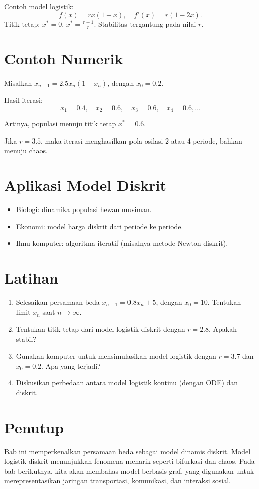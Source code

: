\documentclass{bukumjh}
\begin{document}
Contoh model logistik:
\[
f(x) = rx(1-x), \quad f'(x) = r(1-2x).
\]
Titik tetap: $x^\ast=0$, $x^\ast=\frac{r-1}{r}$.  
Stabilitas tergantung pada nilai $r$.

\section{Contoh Numerik}
Misalkan $x_{n+1} = 2.5x_n(1-x_n)$, dengan $x_0=0.2$.

Hasil iterasi:
\[
x_1=0.4, \quad x_2=0.6, \quad x_3=0.6, \quad x_4=0.6, \dots
\]

Artinya, populasi menuju titik tetap $x^\ast=0.6$.

Jika $r=3.5$, maka iterasi menghasilkan pola osilasi 2 atau 4 periode, bahkan menuju chaos.

\section{Aplikasi Model Diskrit}
\begin{itemize}
    \item Biologi: dinamika populasi hewan musiman.
    \item Ekonomi: model harga diskrit dari periode ke periode.
    \item Ilmu komputer: algoritma iteratif (misalnya metode Newton diskrit).
\end{itemize}

\section{Latihan}
\begin{enumerate}
    \item Selesaikan persamaan beda $x_{n+1}=0.8x_n+5$, dengan $x_0=10$. Tentukan limit $x_n$ saat $n \to \infty$.
    \item Tentukan titik tetap dari model logistik diskrit dengan $r=2.8$. Apakah stabil?
    \item Gunakan komputer untuk mensimulasikan model logistik dengan $r=3.7$ dan $x_0=0.2$. Apa yang terjadi?
    \item Diskusikan perbedaan antara model logistik kontinu (dengan ODE) dan diskrit.
\end{enumerate}

\section{Penutup}
Bab ini memperkenalkan persamaan beda sebagai model dinamis diskrit. Model logistik diskrit menunjukkan fenomena menarik seperti bifurkasi dan chaos. Pada bab berikutnya, kita akan membahas {\jsg model berbasis graf}, yang digunakan untuk merepresentasikan jaringan transportasi, komunikasi, dan interaksi sosial.
\end{document}
